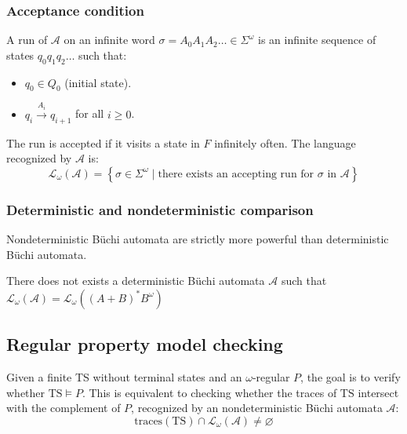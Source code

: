 \subsubsection{Acceptance condition}
A run of $\mathcal{A}$ on an infinite word $\sigma=A_0A_1A_2\dots\in\Sigma^\omega$ is an infinite sequence of states $q_0q_1q_2\dots$ such that: 
\begin{itemize}
    \item $q_0\in Q_0$ (initial state). 
    \item $q_i\xrightarrow{A_i}q_{i+1}$ for all $i\geq 0$. 
\end{itemize}
\noindent The run is accepted if it visits a state in $F$ infinitely often.
The language recognized by $\mathcal{A}$ is: 
\[\mathcal{L}_{\omega}(\mathcal{A})=\left\{\sigma\in\Sigma^\omega\mid\text{there exists an accepting run for }\sigma\text{ in }\mathcal{A}\right\}\]

\subsubsection{Deterministic and nondeterministic comparison}
Nondeterministic Büchi automata are strictly more powerful than deterministic Büchi automata. 
\begin{theorem}
    There does not exists a deterministic Büchi automata $\mathcal{A}$ such that $\mathcal{L}_{\omega}(\mathcal{A})=\mathcal{L}_{\omega}((A+B)^\ast B^\omega)$
\end{theorem}

\subsection{Regular property model checking}
Given a finite TS without terminal states and an $\omega$-regular $P$, the goal is to verify whether $\text{TS} \models P$.
This is equivalent to checking whether the traces of $\text{TS}$ intersect with the complement of $P$, recognized by an nondeterministic Büchi automata $\mathcal{A}$: 
\[\text{traces}(\text{TS})\cap\mathcal{L}_{\omega}(\mathcal{A})\neq\varnothing\]

